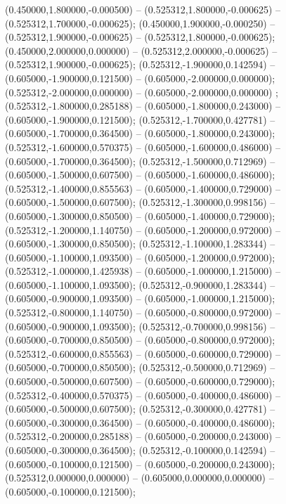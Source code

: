  (0.450000,1.800000,-0.000500) -- (0.525312,1.800000,-0.000625) -- (0.525312,1.700000,-0.000625);
 (0.450000,1.900000,-0.000250) -- (0.525312,1.900000,-0.000625) -- (0.525312,1.800000,-0.000625);
 (0.450000,2.000000,0.000000) -- (0.525312,2.000000,-0.000625) -- (0.525312,1.900000,-0.000625);
 (0.525312,-1.900000,0.142594) -- (0.605000,-1.900000,0.121500) -- (0.605000,-2.000000,0.000000);
 (0.525312,-2.000000,0.000000) -- (0.605000,-2.000000,0.000000) ;
 (0.525312,-1.800000,0.285188) -- (0.605000,-1.800000,0.243000) -- (0.605000,-1.900000,0.121500);
 (0.525312,-1.700000,0.427781) -- (0.605000,-1.700000,0.364500) -- (0.605000,-1.800000,0.243000);
 (0.525312,-1.600000,0.570375) -- (0.605000,-1.600000,0.486000) -- (0.605000,-1.700000,0.364500);
 (0.525312,-1.500000,0.712969) -- (0.605000,-1.500000,0.607500) -- (0.605000,-1.600000,0.486000);
 (0.525312,-1.400000,0.855563) -- (0.605000,-1.400000,0.729000) -- (0.605000,-1.500000,0.607500);
 (0.525312,-1.300000,0.998156) -- (0.605000,-1.300000,0.850500) -- (0.605000,-1.400000,0.729000);
 (0.525312,-1.200000,1.140750) -- (0.605000,-1.200000,0.972000) -- (0.605000,-1.300000,0.850500);
 (0.525312,-1.100000,1.283344) -- (0.605000,-1.100000,1.093500) -- (0.605000,-1.200000,0.972000);
 (0.525312,-1.000000,1.425938) -- (0.605000,-1.000000,1.215000) -- (0.605000,-1.100000,1.093500);
 (0.525312,-0.900000,1.283344) -- (0.605000,-0.900000,1.093500) -- (0.605000,-1.000000,1.215000);
 (0.525312,-0.800000,1.140750) -- (0.605000,-0.800000,0.972000) -- (0.605000,-0.900000,1.093500);
 (0.525312,-0.700000,0.998156) -- (0.605000,-0.700000,0.850500) -- (0.605000,-0.800000,0.972000);
 (0.525312,-0.600000,0.855563) -- (0.605000,-0.600000,0.729000) -- (0.605000,-0.700000,0.850500);
 (0.525312,-0.500000,0.712969) -- (0.605000,-0.500000,0.607500) -- (0.605000,-0.600000,0.729000);
 (0.525312,-0.400000,0.570375) -- (0.605000,-0.400000,0.486000) -- (0.605000,-0.500000,0.607500);
 (0.525312,-0.300000,0.427781) -- (0.605000,-0.300000,0.364500) -- (0.605000,-0.400000,0.486000);
 (0.525312,-0.200000,0.285188) -- (0.605000,-0.200000,0.243000) -- (0.605000,-0.300000,0.364500);
 (0.525312,-0.100000,0.142594) -- (0.605000,-0.100000,0.121500) -- (0.605000,-0.200000,0.243000);
 (0.525312,0.000000,0.000000) -- (0.605000,0.000000,0.000000) -- (0.605000,-0.100000,0.121500);
